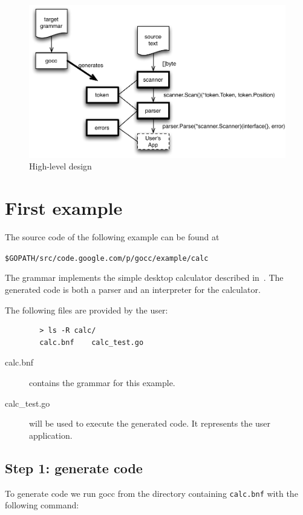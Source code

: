 \documentclass[12pt]{article}
\begin{document}
	\begin{figure}
		\includegraphics[scale=1]{"hl_design"}
		\caption{High-level design}
		\label{fig:hl design}
	\end{figure}

\section{First example}
	The source code of the following example can be found at 

	\verb|$GOPATH/src/code.google.com/p/gocc/example/calc| 

	The grammar implements the simple desktop calculator described in~\cite{Dragon Book}. The generated code is both a parser and an interpreter for the calculator.

	The following files are provided by the user:
	\begin{verbatim}
		> ls -R calc/
		calc.bnf	calc_test.go	
	\end{verbatim}

	\begin{description}
		\item[calc.bnf] contains the grammar for this example.

		\item[calc\_test.go] will be used to execute the generated code. It represents the user application.

	\end{description}

	\subsection{Step 1: generate code}
		To generate code we run gocc from the directory containing \verb|calc.bnf| with the following command:
\end{document}
